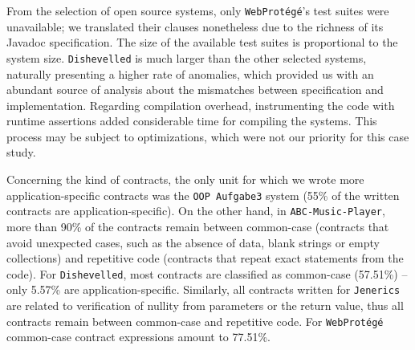 


From the selection of open source systems, only \texttt{WebProtégé}'s test suites were unavailable; we translated their clauses nonetheless due to the richness of its Javadoc specification.
The size of the available test suites is proportional to the system size.
\texttt{Dishevelled} is much larger than the other selected systems, naturally presenting a higher rate of anomalies, which provided us with an abundant source of analysis about the mismatches between specification and implementation. 
Regarding compilation overhead, instrumenting the code with runtime assertions added considerable time for compiling the systems. This process may be subject to optimizations, which were not our priority for this case study.


Concerning the kind of contracts, the only unit for which we wrote more application-specific contracts was the \texttt{OOP Aufgabe3} system (55\% of the written contracts are application-specific). On the other hand, in \texttt{ABC-Music-Player}, more than 90\% of the contracts remain between common-case (contracts that avoid unexpected cases, such as the absence of data, blank strings or empty collections) and repetitive code (contracts that repeat exact statements from the code).
For \texttt{Dishevelled}, most contracts are classified as common-case (57.51\%) -- 
only 5.57\% are application-specific.
Similarly, all contracts written for \texttt{Jenerics} are related to verification of nullity from parameters or the return value, thus all contracts remain between common-case and repetitive code.
For \texttt{WebProt\'{e}g\'{e}}  common-case contract expressions amount to 77.51\%.  



